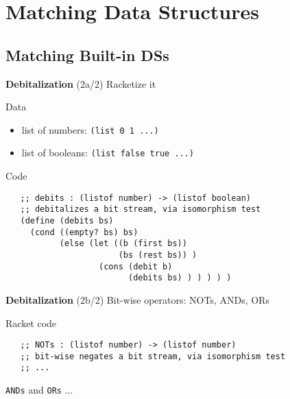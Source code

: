 \documentclass[12pt]{beamer}
\begin{document}
\section{Matching Data Structures}

\subsection{Matching Built-in DSs}

\begin{frame}[fragile]{{\bf Debitalization} (2a/2)}
 Racketize it

 \pause

 Data
 \begin{itemize}
  \item list of numbers: \verb|(list 0 1 ...)|
  \item list of booleans: \verb|(list false true ...)|
 \end{itemize}

 \pause

 Code
 {\scriptsize
  \begin{verbatim}
   ;; debits : (listof number) -> (listof boolean)
   ;; debitalizes a bit stream, via isomorphism test
   (define (debits bs)
     (cond ((empty? bs) bs)
           (else (let ((b (first bs))
                       (bs (rest bs)) )
                   (cons (debit b)
                         (debits bs) ) ) ) ) )
  \end{verbatim}
 }
\end{frame}

\begin{frame}[fragile]{{\bf Debitalization} (2b/2)}
 Bit-wise operators: NOTs, ANDs, ORs

 \pause
 
 Racket code
 {\scriptsize
  \begin{verbatim}
   ;; NOTs : (listof number) -> (listof number)
   ;; bit-wise negates a bit stream, via isomorphism test
   ;; ...
  \end{verbatim}
 }

 \pause

 \verb|ANDs| and \verb|ORs| ...
\end{frame}
\end{document}
